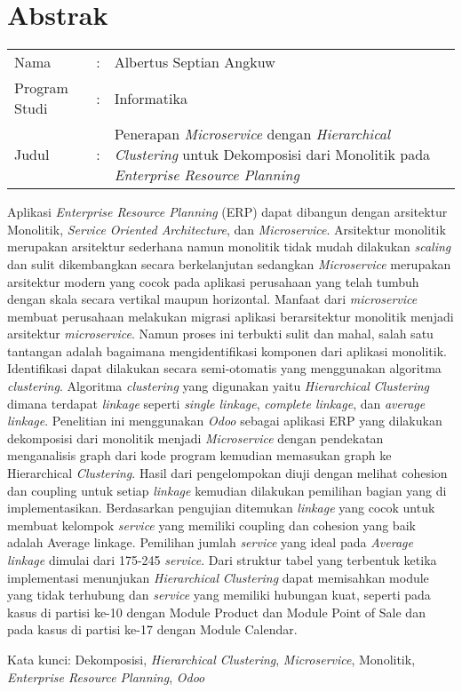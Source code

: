 \chapter*{Abstrak}

\begin{longtable}{@{}p{2.5cm} l p{10.3cm}}
	Nama 			& : & Albertus Septian Angkuw \\
	Program Studi	& : & Informatika \\
	Judul			& : & Penerapan  \textit{Microservice} dengan \textit{Hierarchical Clustering} untuk Dekomposisi dari Monolitik pada \textit{Enterprise Resource Planning} \\
\end{longtable}
 
 Aplikasi \textit{Enterprise Resource Planning} (ERP) dapat dibangun dengan arsitektur Monolitik, \textit{Service Oriented Architecture}, dan \textit{Microservice}. Arsitektur monolitik merupakan arsitektur sederhana namun monolitik tidak mudah dilakukan \textit{scaling} dan sulit dikembangkan secara berkelanjutan sedangkan \textit{Microservice} merupakan arsitektur modern yang cocok pada aplikasi perusahaan yang telah tumbuh dengan skala secara vertikal maupun horizontal. Manfaat dari \textit{microservice} membuat   perusahaan melakukan migrasi aplikasi berarsitektur monolitik menjadi arsitektur \textit{microservice}. Namun proses ini terbukti sulit dan mahal, salah satu tantangan adalah bagaimana mengidentifikasi komponen dari aplikasi monolitik. Identifikasi dapat dilakukan secara semi-otomatis yang menggunakan algoritma \textit{clustering}. Algoritma \textit{clustering} yang digunakan yaitu \textit{Hierarchical} \textit{Clustering} dimana terdapat \textit{linkage} seperti \textit{single linkage}, \textit{complete linkage}, dan \textit{average linkage}.
Penelitian ini menggunakan \textit{Odoo} sebagai aplikasi ERP yang dilakukan dekomposisi dari monolitik menjadi \textit{Microservice} dengan pendekatan menganalisis graph dari kode program kemudian memasukan graph ke Hierarchical \textit{Clustering}. Hasil dari pengelompokan diuji dengan melihat cohesion dan coupling untuk setiap \textit{linkage} kemudian dilakukan pemilihan bagian yang di implementasikan. Berdasarkan pengujian ditemukan \textit{linkage} yang cocok untuk membuat kelompok \textit{service} yang memiliki coupling dan cohesion yang baik adalah Average linkage. Pemilihan jumlah \textit{service} yang ideal pada \textit{Average linkage} dimulai dari 175-245 \textit{service}. Dari struktur tabel yang terbentuk ketika implementasi menunjukan \textit{Hierarchical} \textit{Clustering} dapat memisahkan module yang tidak terhubung dan \textit{service} yang memiliki hubungan kuat, seperti pada kasus di partisi ke-10 dengan Module Product dan Module Point of Sale dan pada kasus di partisi ke-17 dengan Module Calendar.

\noindent Kata kunci: Dekomposisi, \textit{Hierarchical Clustering}, \textit{Microservice}, Monolitik, \textit{Enterprise Resource Planning}, \textit{Odoo}